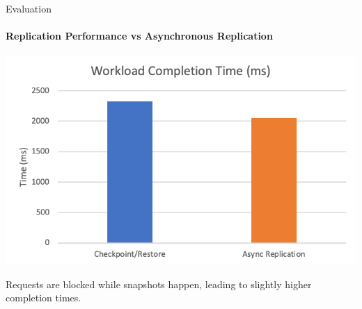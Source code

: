 \documentclass{beamer}
\begin{document}
\begin{frame}{Evaluation}
  \framesubtitle{Replication Performance vs Asynchronous Replication}

  \centering
  \includegraphics[scale=0.3]{../paper/async-replication}

  \hspace{1cm}

  Requests are blocked while snapshots happen, leading to slightly higher completion times.
\end{frame}
\end{document}
